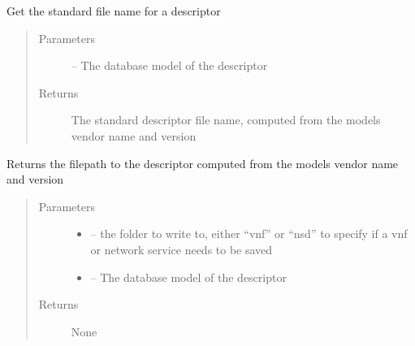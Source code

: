 \documentclass[letterpaper,10pt,english]{sphinxmanual}
\begin{document}
\begin{fulllineitems}
\label{_source/son_editor.util:son_editor.util.descriptorutil.get_file_name}
Get the standard file name for a descriptor
\begin{quote}\begin{description}
\item[{Parameters}] \leavevmode
{} -- The database  model of the descriptor

\item[{Returns}] \leavevmode
The standard descriptor file name, computed from the models vendor name and version

\end{description}\end{quote}

\end{fulllineitems}


\begin{fulllineitems}
\label{_source/son_editor.util:son_editor.util.descriptorutil.get_file_path}
Returns the filepath to the descriptor computed
from the models vendor name and version
\begin{quote}\begin{description}
\item[{Parameters}] \leavevmode\begin{itemize}
\item {} 
 -- the folder to write to, either ``vnf'' or ``nsd''
to specify if a vnf or network service needs to be saved

\item {} 
 -- The database  model of the descriptor

\end{itemize}

\item[{Returns}] \leavevmode
None

\end{description}\end{quote}

\end{fulllineitems}
\end{document}
